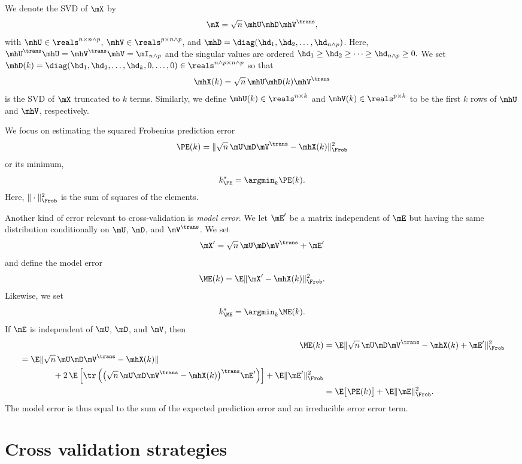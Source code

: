 We denote the SVD of $\mX$ by
\[
    \mX = \sqrt{n} \, \mhU \mhD \mhV^\trans, 
\]
with $\mhU \in \reals^{n \times n \wedge p}$, $\mhV \in \reals^{p \times n
\wedge p}$, and $\mhD = \diag( \hd_1, \hd_2, \ldots, \hd_{n \wedge p})$. Here,
$\mhU^\trans \mhU = \mhV^\trans \mhV = \mI_{n \wedge p}$ and the singular
values are ordered
\(
    \hd_1 \geq \hd_2 \geq \cdots \geq \hd_{n \wedge p} \geq 0.
\)
We set $\mhD(k) = \diag( \hd_1, \hd_2, \ldots, \hd_k, 0, \ldots, 0) \in \reals^{n \wedge p \times n \wedge p}$ so that
\[
    \mhX(k) = \sqrt{n} \, \mhU \mhD(k) \mhV^\trans
\]
is the SVD of $\mX$ truncated to $k$ terms.  Similarly, we define $\mhU(k) \in 
\reals^{n \times k}$ and $\mhV(k) \in \reals^{p \times k}$ to be the first $k$ 
rows of $\mhU$ and $\mhV$, respectively.

We focus on estimating the squared Frobenius prediction error
\[
    \PE(k) = \| \sqrt{n} \, \mU \mD \mV^\trans - \mhX(k) \|_\Frob^2
\]
or its minimum,
\[
    k^\ast_{\PE} = \argmin_k \PE(k).
\]  
Here, $\| \cdot \|_\Frob^2$ is the sum of squares of the elements.

Another kind of error relevant to cross-validation is \emph{model error}.  We
let $\mE'$ be a matrix independent of $\mE$ but having the same distribution conditionally on $\mU$, $\mD$, and $\mV^\trans$.  We set 
\[
    \mX' = \sqrt{n} \, \mU \mD \mV^\trans + \mE'
\]
and define the model error
\[
    \ME(k) = \E \| \mX' - \mhX(k) \|_\Frob^2.
\]
Likewise, we set
\[
    k^\ast_{\ME} = \argmin_k \ME(k).
\]
If $\mE$ is independent of $\mU$, $\mD$, and $\mV$, then
\begin{align*}
    \ME(k) 
        &= \E\| \sqrt{n} \, \mU \mD \mV^\trans - \mhX(k) + \mE' \|_\Frob^2 \\
    \begin{split}
        &= \E\| \sqrt{n} \, \mU \mD \mV^\trans - \mhX(k) \| \\
           &\qquad\qquad+ 
           2 \, 
           \E \left[
               \tr \left( 
                   \big( \sqrt{n} \, \mU \mD \mV^\trans - \mhX(k) \big)^\trans 
                   \mE'
               \right)
           \right]
           +
           \E\| \mE' \|_\Frob^2 
    \end{split} \\
        &= \E\big[\PE(k)\big] + \E \| \mE \|_\Frob^2.
\end{align*}
The model error is thus equal to the sum of the expected prediction error
and an irreducible error error term.


\section{Cross validation strategies}


